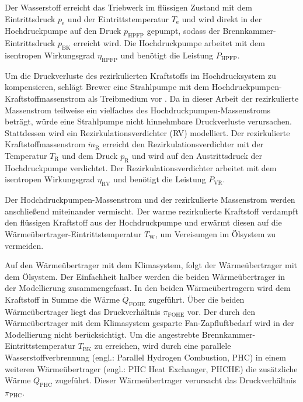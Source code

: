 Der Wasserstoff erreicht das Triebwerk im flüssigen Zustand mit dem Eintrittsdruck $p_\mathrm{e}$ und der Eintrittstemperatur $T_\mathrm{e}$ und wird direkt in der Hochdruckpumpe auf den Druck $p_{\mathrm{HPFP}}$ gepumpt, sodass der Brennkammer-Eintrittsdruck $p_{\mathrm{BK}}$ erreicht wird. Die Hochdruckpumpe arbeitet mit dem isentropen Wirkungsgrad $\eta_{\mathrm{HPFP}}$ und benötigt die Leistung $P_{\mathrm{HPFP}}$. 

Um die Druckverluste des rezirkulierten Kraftstoffs im Hochdrucksystem zu kompensieren, schlägt Brewer eine Strahlpumpe mit dem  Hochdruckpumpen-Kraftstoffmassenstrom als Treibmedium vor \cite{Brewer.1991}. Da in dieser Arbeit der rezirkulierte Massenstrom teilweise ein vielfaches des Hochdruckpumpen-Massenstroms beträgt, würde eine Strahlpumpe nicht hinnehmbare Druckverluste verursachen. Stattdessen wird ein Rezirkulationsverdichter (RV) modelliert. Der rezirkulierte Kraftstoffmassenstrom $\dot{m}_\mathrm{R}$ erreicht den Rezirkulationsverdichter mit der Temperatur $T_\mathrm{R}$ und dem Druck $p_\mathrm{R}$ und wird auf den Austrittsdruck der Hochdruckpumpe verdichtet. Der Rezirkulationsverdichter arbeitet mit dem isentropen Wirkungsgrad $\eta_\mathrm{RV}$ und benötigt die Leistung $P_\mathrm{VR}$. 

Der Hodchdruckpumpen-Massenstrom und der rezirkulierte Massenstrom werden anschließend miteinander vermischt. Der warme rezirkulierte Kraftstoff verdampft den flüssigen Kraftstoff aus der Hochdruckpumpe und erwärmt diesen auf die Wärmeübertrager-Eintrittstemperatur $T_\mathrm{W}$, um Vereisungen im Ölsystem zu vermeiden.

Auf den Wärmeübertrager mit dem Klimasystem, folgt der Wärmeübertrager mit dem Ölsystem. Der Einfachheit halber werden die beiden Wärmeübertrager in der Modellierung zusammengefasst. In den beiden Wärmeübertragern wird dem Kraftstoff in Summe die Wärme $\dot{Q}_{\mathrm{FOHE}}$ zugeführt. Über die beiden Wärmeübertrager liegt das Druckverhältnis $\pi_{\mathrm{FOHE}}$ vor. Der durch den Wärmeübertrager mit dem Klimasystem gesparte Fan-Zapfluftbedarf wird in der Modellierung nicht berücksichtigt. Um die angestrebte Brennkammer-Eintrittstemperatur $T_{\mathrm{BK}}$ zu erreichen, wird durch eine parallele Wasserstoffverbrennung (engl.: Parallel Hydrogen Combustion, PHC) in einem weiteren Wärmeübertrager (engl.: PHC Heat Exchanger, PHCHE) die zusätzliche Wärme $\dot{Q}_{\mathrm{PHC}}$ zugeführt. Dieser Wärmeübertrager verursacht das Druckverhältnis $\pi_{\mathrm{PHC}}$. 

